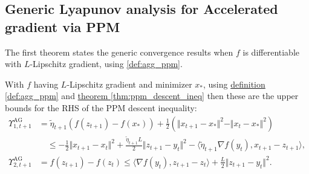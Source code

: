 \documentclass[12pt]{article}
\begin{document}
    \subsection{Generic Lyapunov analysis for Accelerated gradient via PPM}
        The first theorem states the generic convergence results when $f$ is differentiable with $L$-Lipschitz gradient, using \ref*{def:agg_ppm}. 
        \begin{lemma}\label{lemma:smooth_agg_lyapunov_upper_bound}
            With $f$ having $L$-Lipschitz gradient and minimizer $x_*$, using \hyperref[def:agg_ppm]{definition \ref*{def:agg_ppm}} and \hyperref[thm:ppm_descent_ineq]{theorem \ref*{thm:ppm_descent_ineq}} then these are the upper bounds for the RHS of the PPM descent inequality: 
            \begin{align*}
                \Upsilon_{1, t + 1}^{\text{AG}}&= \tilde \eta_{t + 1} (f(z_{t + 1}) - f(x_*))
                + \frac{1}{2}(
                    \Vert x_{t + 1} - x_*\Vert^2 - \Vert x_t - x_* \Vert^2
                )  
                \\
                & \quad \le 
                - \frac{1}{2}\Vert x_{t + 1} - x_t\Vert^2 + 
                \frac{\tilde \eta_{t + 1} L}{2}\Vert z_{t + 1} - y_t\Vert^2
                - 
                \langle \tilde \eta_{t + 1} \nabla f(y_t), x_{t + 1} - z_{t + 1} \rangle, 
                \\
                \Upsilon_{2, t + 1}^{\text{AG}} 
                &= f(z_{t + 1}) - f(z_t) 
                \le 
                \langle \nabla f(y_t), z_{t + 1} - z_t\rangle + 
                \frac{L}{2}\Vert z_{t + 1} - y_t\Vert^2. 
            \end{align*}
        \end{lemma}
\end{document}
